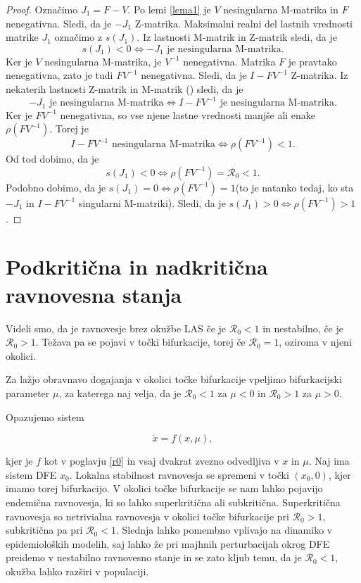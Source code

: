 \documentclass[a4paper,12pt]{article}
\newcommand{\R}{\mathcal R}
\begin{document}
\begin{proof}
    Označimo \(J_1=F-V\). Po lemi \ref{lema1} je \(V\) nesingularna M-matrika in \(F\) nenegativna. 
    Sledi, da je \(-J_1\) Z-matrika. 
    Maksimalni realni del lastnih vrednosti matrike \(J_1\) označimo z \(s(J_1)\). Iz lastnosti 
    M-matrik in Z-matrik sledi, da je 
    \[s(J_1)<0 \Leftrightarrow -J_1\textrm{ je nesingularna M-matrika}.\]
    Ker je \(V\) nesingularna M-matrika, je \(V^{-1}\) nenegativna. Matrika \(F\) je pravtako 
    nenegativna, zato je tudi \(FV^{-1}\) nenegativna. Sledi, da je \(I-FV^{-1}\) Z-matrika. 
    Iz nekaterih lastnosti Z-matrik in M-matrik (\cite{vir1}) sledi, da je 
    \[-J_1\textrm{ je nesingularna M-matrika}\Leftrightarrow I-FV^{-1} \textrm{ je nesingularna M-matrika}.\]
    Ker je \(FV^{-1}\) nenegativna, so vse njene lastne vrednosti manjše ali enake \(\rho(FV^{-1})\). Torej je 
    \[I-FV^{-1}\textrm{ nesingularna M-matrika}\Leftrightarrow \rho(FV^{-1})<1. \]
    Od tod dobimo, da je 
    \[s(J_1)<0 \Leftrightarrow \rho(FV^{-1})=\R_0<1.\]
    Podobno dobimo, da je \(s(J_1)=0\Leftrightarrow \rho(FV^{-1})=1\)(to je natanko tedaj, ko sta \(-J_1\) in \(I-FV^{-1}\) singularni M-matriki). 
    Sledi, da je \(s(J_1)>0 \Leftrightarrow \rho(FV^{-1})>1\).

\end{proof}

\section{Podkritična in nadkritična ravnovesna stanja}

Videli smo, da je ravnovesje brez okužbe LAS če je \(\R_0<1\) in nestabilno, če 
je \(\R_0>1\). Težava pa se pojavi v točki bifurkacije, torej če \(\R_0=1\), oziroma
v njeni okolici.

Za lažjo obravnavo dogajanja v okolici točke bifurkacije vpeljimo bifurkacijski parameter
\(\mu\), za katerega naj velja, da je \(\R_0<1\) za \(\mu<0\) in \(\R_0>1\) za \(\mu>0\).

Opazujemo sistem 

\begin{equation}\label{eq4}
\dot{x}=f(x,\mu),
\end{equation}

kjer je \(f\) kot v poglavju \ref{r0} in vsaj dvakrat zvezno odvedljiva v \(x\) in \(\mu\).
Naj ima sistem DFE \(x_0\). Lokalna stabilnost ravnovesja se spremeni v točki \((x_0,0)\), kjer 
imamo torej bifurkacijo. V okolici točke bifurkacije se nam lahko pojavijo endemična 
ravnovesja, ki so lahko superkritična ali subkritična. Superkritična ravnovesja so 
netrivialna ravnovesja v okolici točke bifurkacije pri \(\R_0>1\),
subkritična pa pri \(\R_0<1\). Slednja lahko pomembno vplivajo na dinamiko v 
epidemioloških modelih, saj lahko že pri majhnih perturbacijah okrog DFE preidemo
v nestabilno ravnovesno stanje in se zato kljub temu, da je \(\R_0<1\), okužba lahko 
razširi v populaciji.
\end{document}
